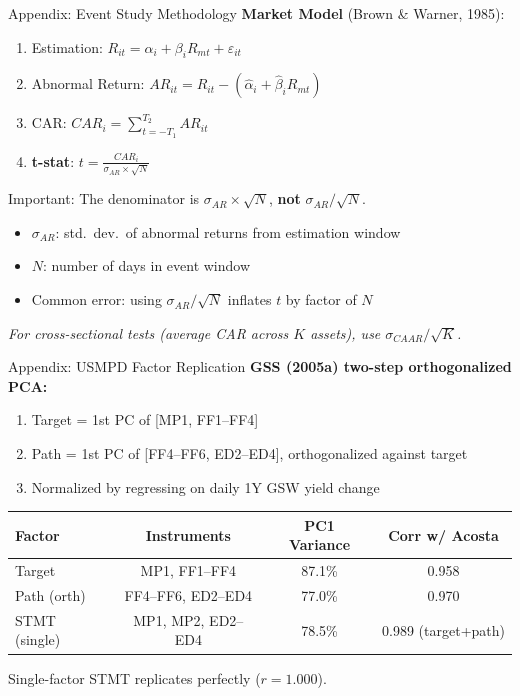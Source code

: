 \documentclass[aspectratio=169, 11pt]{beamer}
\begin{document}
\begin{frame}{Appendix: Event Study Methodology}
\textbf{Market Model} (Brown \& Warner, 1985):
\begin{enumerate}
  \item Estimation: $R_{it} = \alpha_i + \beta_i R_{mt} + \varepsilon_{it}$
  \item Abnormal Return: $AR_{it} = R_{it} - (\hat{\alpha}_i + \hat{\beta}_i R_{mt})$
  \item CAR: $CAR_i = \sum_{t=-T_1}^{T_2} AR_{it}$
  \item \textbf{t-stat}: $\displaystyle t = \frac{CAR_i}{\sigma_{AR} \times \sqrt{N}}$
\end{enumerate}

\vspace{0.5em}
\alert{Important:} The denominator is $\sigma_{AR} \times \sqrt{N}$, \textbf{not} $\sigma_{AR} / \sqrt{N}$.

\vspace{0.3em}
\begin{itemize}
  \item $\sigma_{AR}$: std.\ dev.\ of abnormal returns from estimation window
  \item $N$: number of days in event window
  \item Common error: using $\sigma_{AR}/\sqrt{N}$ inflates $t$ by factor of $N$
\end{itemize}

\vspace{0.5em}
\small\textit{For cross-sectional tests (average CAR across $K$ assets), use $\sigma_{CAAR}/\sqrt{K}$.}
\end{frame}

\begin{frame}{Appendix: USMPD Factor Replication}
\textbf{GSS (2005a) two-step orthogonalized PCA:}
\begin{enumerate}
  \item Target = 1st PC of [MP1, FF1--FF4]
  \item Path = 1st PC of [FF4--FF6, ED2--ED4], orthogonalized against target
  \item Normalized by regressing on daily 1Y GSW yield change
\end{enumerate}

\vspace{0.5em}
\begin{tabular}{lccc}
\toprule
Factor & Instruments & PC1 Variance & Corr w/ Acosta \\
\midrule
Target & MP1, FF1--FF4 & 87.1\% & 0.958 \\
Path (orth) & FF4--FF6, ED2--ED4 & 77.0\% & 0.970 \\
STMT (single) & MP1, MP2, ED2--ED4 & 78.5\% & 0.989 (target+path) \\
\bottomrule
\end{tabular}

\vspace{0.5em}
Single-factor STMT replicates perfectly ($r = 1.000$).
\end{frame}
\end{document}
